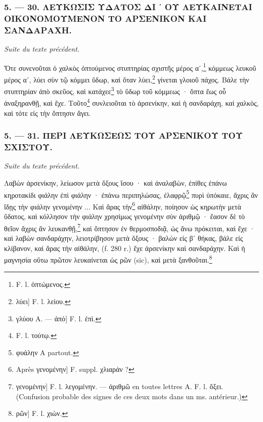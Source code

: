 \documentclass[a4paper, 11pt, oneside, polutonikogreek, french]{article}
\begin{document}
\bigskip
\centerline{\EightStarTaper}
\centerline{\EightStarTaper\EightStarTaper}
\bigskip

\subsubsection{5. --- 30. ΛΕΥΚΩΣΙΣ ΥΔΑΤΟΣ ΔΙ ᾽ ΟΥ ΛΕΥΚΑΙΝΕΤΑΙ ΟΙΚΟΝΟΜΟΥΜΕΝΟΝ ΤΟ ΑΡΣΕΝΙΚΟΝ ΚΑΙ ΣΑΝΔΑΡΑΧΗ.}

\emph{Suite du texte précédent.}

\bigskip

Ὅτε συνενοῦται ὁ χαλκὸς ὀπτούμενος στυπτηρίας σχιστῆς μέρος αʹ,\footnote{F. l. ὀπτώμενος.} κόμμεως λευκοῦ μέρος αʹ, λύει σὺν τῷ κόμμει ὕδωρ, καὶ ὅταν λύει,\footnote{λύει] F. l. λείου.} γίνεται γλοιοῦ πάχος. Βάλε τὴν στυπτηρίαν ἀπὸ σκεῦος, καὶ κατάχεε\footnote{γλύου A. --- ἀπὸ] F. l. ἐπὶ.} τὸ ὕδωρ τοῦ κόμμεως · ὄπτα ἕως οὗ ἀναξηρανθῇ, καὶ ἔχε. Τοῦτο\footnote{F. l. τούτῳ.} συνλειοῦται τὸ ἀρσενίκην, καὶ ἡ σανδαράχη, καὶ χαλκὸς, καὶ τότε εἰς τὴν ὄπτησιν ἄγει.

\bigskip
\centerline{\EightStarTaper}
\centerline{\EightStarTaper\EightStarTaper}
\bigskip

\subsubsection{5. --- 31. ΠΕΡΙ ΛΕΥΚΩΣΕΩΣ ΤΟΥ ΑΡΣΕΝΙΚΟΥ ΤΟΥ ΣΧΙΣΤΟΥ.}

\emph{Suite du texte précédent.}

\bigskip

Λαβὼν ἀρσενίκην, λείωσον μετὰ ὄξους ἴσου · καὶ ἀναλαβὼν, ἐπίθες ἐπάνω κηροτακίδι φιάλην ἐπὶ φιάλην · ἐπάνω περιπηλώσας, ἐλαφρῷ\footnote{φυάλην A partout.} πυρὶ ὑπόκαιε, ἄχρις ἂν ἴδῃς τὴν φιάλην γενομένην ... Καὶ ἄρας τὴν\footnote{Après γενομένην] F. suppl. χλιαράν ?} αἰθάλην, ποίησον ὡς κηρωτὴν μετὰ ὕδατος, καὶ κόλλησον τὴν φιάλην χρησίμως γενομένην σὺν ἀριθμῷ · ἔασον δὲ τὸ θεῖον ἄχρις ἂν λευκανθῇ,\footnote{γενομένην] F. l. λεγομένην. --- ἀριθμῶ en toutes lettres A. F. l. ὄξει. (Confusion probable des signes de ces deux mots dans un ms. antérieur.)} καὶ ὄπτησον ἐν θερμοσποδιᾷ, ὡς ἄνω πρόκειται, καὶ ἔχε · καὶ λαβὼν σανδαράχην, λειοτρίβησον μετὰ ὄξους · βαλὼν εἰς βʹ θήκας, βάλε εἰς κλίβανον, καὶ ἄρας τὴν αἰθάλην, (f. 280 r.) ἔχε ἀρσενίκην καὶ σανδαράχην. Καὶ ἡ μαγνησία οὕτω πρῶτον λευκαίνεται ὡς ρῶν (sic), καὶ μετὰ ξανθοῦται.\footnote{ρῶν] F. l. χιὼν.}

\bigskip
\centerline{\EightStarTaper}
\centerline{\EightStarTaper\EightStarTaper}
\bigskip
\end{document}
